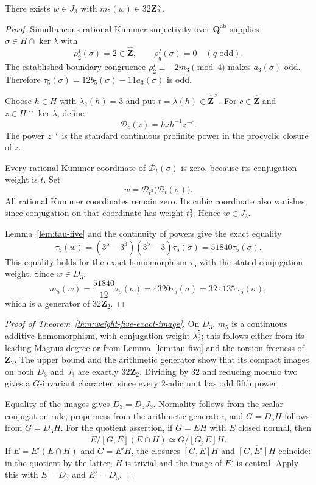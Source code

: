 \begin{proposition}\label{prop:weight-five-arithmetic-generator}
There exists $w\in J_3$ with $m_5(w)\in32\mathbf Z_2^\times$.
\end{proposition}

\begin{proof}
Simultaneous rational Kummer surjectivity over
$\mathbf Q^{\mathrm{ab}}$ supplies $\sigma\in H\cap\ker\lambda$
with
\[
 \rho_2^I(\sigma)=2\in\widehat{\mathbf Z},\qquad
 \rho_q^I(\sigma)=0\quad(q\text{ odd}).
\]
The established boundary congruence
$\rho_2^I\equiv-2m_3\pmod4$ makes $a_3(\sigma)$ odd.
Therefore $\tau_5(\sigma)=12b_5(\sigma)-11a_3(\sigma)$ is odd.

Choose $h\in H$ with $\lambda_2(h)=3$ and put
$t=\lambda(h)\in\widehat{\mathbf Z}^{\times}$.  For
$c\in\widehat{\mathbf Z}$ and $z\in H\cap\ker\lambda$, define
\[
 \mathcal D_c(z)=hzh^{-1}z^{-c}.
\]
The power $z^{-c}$ is the standard continuous profinite power
in the procyclic closure of $z$.

Every rational Kummer coordinate of $\mathcal D_t(\sigma)$
is zero, because its conjugation weight is $t$.  Set
\[
 w=\mathcal D_{t^3}\bigl(\mathcal D_t(\sigma)\bigr).
\]
All rational Kummer coordinates remain zero.  Its cubic
coordinate also vanishes, since conjugation on that coordinate
has weight $t_2^3$.  Hence $w\in J_3$.

Lemma~\ref{lem:tau-five} and the continuity of powers give the
exact equality
\[
 \tau_5(w)=(3^5-3^3)(3^5-3)\tau_5(\sigma)
          =51840\tau_5(\sigma).
\]
This equality holds for the exact homomorphism $\tau_5$ with the
stated conjugation weight.  Since $w\in D_3$,
\[
 m_5(w)=\frac{51840}{12}\tau_5(\sigma)
       =4320\tau_5(\sigma)
       =32\cdot135\,\tau_5(\sigma),
\]
which is a generator of $32\mathbf Z_2$.
\end{proof}

\begin{proof}[Proof of Theorem~\ref{thm:weight-five-exact-image}]
On $D_3$, $m_5$ is a continuous additive homomorphism, with
conjugation weight $\lambda_2^5$; this follows either from its
leading Magnus degree or from Lemma~\ref{lem:tau-five} and
the torsion-freeness of $\mathbf Z_2$.  The upper bound and
the arithmetic generator show that its compact images on
both $D_3$ and $J_3$ are exactly $32\mathbf Z_2$.  Dividing
by $32$ and reducing modulo two gives a $G$-invariant
character, since every $2$-adic unit has odd fifth power.

Equality of the images gives $D_3=D_5J_3$.  Normality follows
from the scalar conjugation rule, properness from the
arithmetic generator, and $G=D_5H$ follows from $G=D_3H$.
For the quotient assertion, if $G=EH$ with $E$ closed normal,
then
\[
 E/\overline{[G,E](E\cap H)}
 \simeq G/\overline{[G,E]H}.
\]
If $E=E'(E\cap H)$ and $G=E'H$, the closures
$\overline{[G,E]H}$ and $\overline{[G,E']H}$ coincide: in
the quotient by the latter, $H$ is trivial and the image
of $E'$ is central.  Apply this with $E=D_3$ and $E'=D_5$.
\end{proof}

